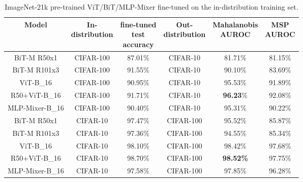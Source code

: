 \documentclass{article}
\newcommand{\test}{\mathcal{D_{\mathrm{test}}}}
\begin{document}
\begin{table}[h]
\begin{center}	
\vspace{-1em}
\caption{ImageNet-21k pre-trained ViT/BiT/MLP-Mixer fine-tuned on the in-distribution training set. }
\begin{tabular}{ c|c|c|c|c|c } 
	Model & \makecell{In-\\distribution} & \makecell{fine-tuned\\test\\accuracy} & \makecell{Out-\\distribution} & \makecell{Mahalanobis\\AUROC} & \makecell{MSP\\AUROC} \\
	\hline
	BiT-M R50x1 & CIFAR-100 & 87.01\% & CIFAR-10 & 81.71\% & 81.15\% \\ 
	BiT-M R101x3 & CIFAR-100 & 91.55\% & CIFAR-10 & 90.10\% & 83.69\% \\ 
ViT-B\_16 & CIFAR-100 & 90.95\% & CIFAR-10 & 95.53\% & 91.89\% \\
	R50+ViT-B\_16 & CIFAR-100 & 91.71\% & CIFAR-10 & \textbf{96.23}\% & 92.08\% \\
		MLP-Mixer-B\_16 & CIFAR-100 & 90.40\% & CIFAR-10 & 95.31\% & 90.22\% \\
\hline
	BiT-M R50x1 & CIFAR-10 & 97.47\% & CIFAR-100 & 95.52\% & 85.87\% \\
	BiT-M R101x3 & CIFAR-10 & 97.36\% & CIFAR-100 & 94.55\% & 85.34\% \\
	ViT-B\_16 & CIFAR-10 & 98.10\% & CIFAR-100 & 98.42\% & 97.68\% \\
	R50+ViT-B\_16 & CIFAR-10 & 98.70\% & CIFAR-100 & \textbf{98.52\%} & 97.75\% \\
		MLP-Mixer-B\_16 & CIFAR-10 & 97.58\% & CIFAR-100 & 97.85\% & 96.28\% \\
\bottomrule
\end{tabular}
\vspace{-1em}
\label{tab:ViT_fine-tuned}
\end{center}
\end{table}
\end{document}

